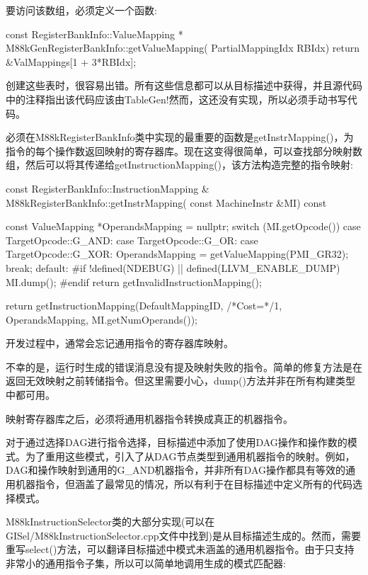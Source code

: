 要访问该数组，必须定义一个函数:

\begin{cpp}
const RegisterBankInfo::ValueMapping *
M88kGenRegisterBankInfo::getValueMapping(
        PartialMappingIdx RBIdx) {
    return &ValMappings[1 + 3*RBIdx];
}
\end{cpp}

创建这些表时，很容易出错。所有这些信息都可以从目标描述中获得，并且源代码中的注释指出该代码应该由TableGen!然而，这还没有实现，所以必须手动书写代码。

必须在M88kRegisterBankInfo类中实现的最重要的函数是getInstrMapping()，为指令的每个操作数返回映射的寄存器库。现在这变得很简单，可以查找部分映射数组，然后可以将其传递给getInstructionMapping()，该方法构造完整的指令映射:

\begin{cpp}
const RegisterBankInfo::InstructionMapping &
M88kRegisterBankInfo::getInstrMapping(
        const MachineInstr &MI) const {
    const ValueMapping *OperandsMapping = nullptr;
    switch (MI.getOpcode()) {
    case TargetOpcode::G_AND:
    case TargetOpcode::G_OR:
    case TargetOpcode::G_XOR:
        OperandsMapping = getValueMapping(PMI_GR32);
        break;
    default:
#if !defined(NDEBUG) || defined(LLVM_ENABLE_DUMP)
        MI.dump();
#endif
        return getInvalidInstructionMapping();
    }

    return getInstructionMapping(DefaultMappingID, /*Cost=*/1,
                                 OperandsMapping,
                                 MI.getNumOperands());
}
\end{cpp}

开发过程中，通常会忘记通用指令的寄存器库映射。

不幸的是，运行时生成的错误消息没有提及映射失败的指令。简单的修复方法是在返回无效映射之前转储指令。但这里需要小心，dump()方法并非在所有构建类型中都可用。

映射寄存器库之后，必须将通用机器指令转换成真正的机器指令。


对于通过选择DAG进行指令选择，目标描述中添加了使用DAG操作和操作数的模式。为了重用这些模式，引入了从DAG节点类型到通用机器指令的映射。例如，DAG和操作映射到通用的G\_AND机器指令，并非所有DAG操作都具有等效的通用机器指令，但涵盖了最常见的情况，所以有利于在目标描述中定义所有的代码选择模式。

M88kInstructionSelector类的大部分实现(可以在GISel/M88kInstructionSelector.cpp文件中找到)是从目标描述生成的。然而，需要重写select()方法，可以翻译目标描述中模式未涵盖的通用机器指令。由于只支持非常小的通用指令子集，所以可以简单地调用生成的模式匹配器:

